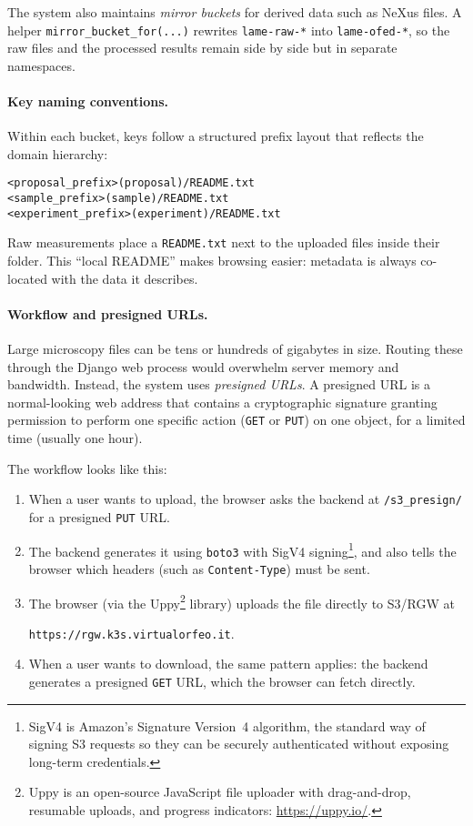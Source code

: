 The system also maintains \emph{mirror buckets} for derived data such as NeXus files.  
A helper \texttt{mirror\_bucket\_for(...)} rewrites \texttt{lame-raw-*} into \texttt{lame-ofed-*}, 
so the raw files and the processed results remain side by side but in separate namespaces.

\paragraph{Key naming conventions.}
Within each bucket, keys follow a structured prefix layout that reflects the domain hierarchy:  
\begin{center}
	\texttt{<proposal\_prefix>(proposal)/README.txt} \\
	\texttt{<sample\_prefix>(sample)/README.txt} \\
	\texttt{<experiment\_prefix>(experiment)/README.txt}
\end{center}

Raw measurements place a \texttt{README.txt} next to the uploaded files inside their folder.  
This “local README” makes browsing easier: metadata is always co-located with the data it describes.

\paragraph{Workflow and presigned URLs.}
Large microscopy files can be tens or hundreds of gigabytes in size.  
Routing these through the Django web process would overwhelm server memory and bandwidth.  
Instead, the system uses \emph{presigned URLs}.  
A presigned URL is a normal-looking web address that contains a cryptographic signature 
granting permission to perform one specific action (\texttt{GET} or \texttt{PUT}) on one object, 
for a limited time (usually one hour).  

The workflow looks like this:
\begin{enumerate}
	\item When a user wants to upload, the browser asks the backend at \texttt{/s3\_presign/} for a presigned \texttt{PUT} URL.  
	\item The backend generates it using \texttt{boto3} with SigV4 signing\footnote{%
		SigV4 is Amazon’s Signature Version~4 algorithm, the standard way of signing S3 requests 
		so they can be securely authenticated without exposing long-term credentials.}, 
	and also tells the browser which headers (such as \texttt{Content-Type}) must be sent.  
	\item The browser (via the Uppy\footnote{Uppy is an open-source JavaScript file uploader with drag-and-drop, 
		resumable uploads, and progress indicators: \url{https://uppy.io/}.} library) 
	uploads the file directly to S3/RGW at 
	
	\texttt{https://rgw.k3s.virtualorfeo.it}.  
	\item When a user wants to download, the same pattern applies: the backend generates a presigned \texttt{GET} URL, 
	which the browser can fetch directly.  
\end{enumerate}

